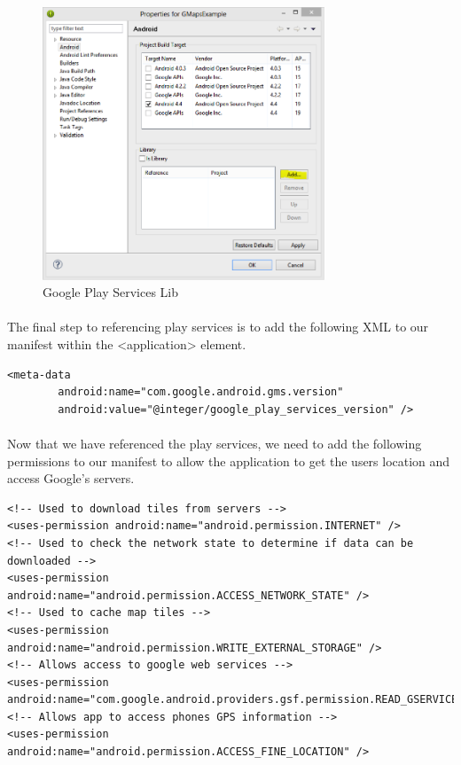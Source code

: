 \begin{figure}[H]%
\centering
\includegraphics[width=0.75\textwidth]{images/gplay-services-lib}
\caption{Google Play Services Lib}
\label{fig:gplay-services-lib}
\end{figure}

\paragraph{} The final step to referencing play services is to add the following XML to our manifest within the <application> element.

\begin{lstlisting}
<meta-data
    	android:name="com.google.android.gms.version"
    	android:value="@integer/google_play_services_version" />
\end{lstlisting}

\paragraph{} Now that we have referenced the play services, we need to add the following permissions to our manifest to allow the application to get the users location and access Google’s servers.

\begin{lstlisting}
<!-- Used to download tiles from servers -->
<uses-permission android:name="android.permission.INTERNET" />
<!-- Used to check the network state to determine if data can be downloaded -->
<uses-permission android:name="android.permission.ACCESS_NETWORK_STATE" />
<!-- Used to cache map tiles -->
<uses-permission android:name="android.permission.WRITE_EXTERNAL_STORAGE" />
<!-- Allows access to google web services -->
<uses-permission android:name="com.google.android.providers.gsf.permission.READ_GSERVICES"/>
<!-- Allows app to access phones GPS information -->
<uses-permission android:name="android.permission.ACCESS_FINE_LOCATION" />
\end{lstlisting}

